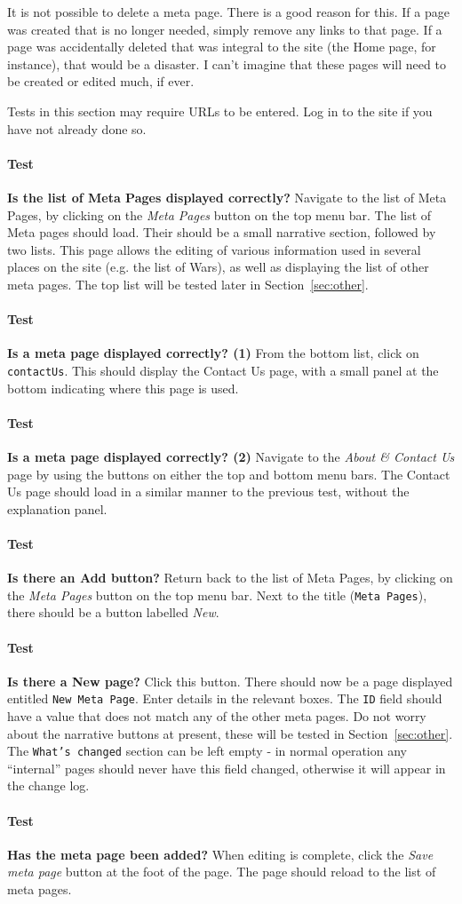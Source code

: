 \documentclass[12pt]{article}
\newcounter{Test}
\newcommand{\test}[1]{%
\stepcounter{Test}%
\paragraph{Test \theTest} \textbf{#1} }
\begin{document}
It is not possible to delete a meta page. There is a good reason for this. If a page was created that is no longer needed, simply remove any links to that page. If a page was accidentally deleted that was integral to the site (the Home page, for instance), that would be a disaster. I can't imagine that these pages will need to be created or edited much, if ever.

Tests in this section may require URLs to be entered. Log in to the site if you have not already done so.

\test{Is the list of Meta Pages displayed correctly?}
Navigate to the list of Meta Pages, by clicking on the \textit{Meta Pages} button on the top menu bar. The list of Meta pages should load. Their should be a small narrative section, followed by two lists. This page allows the editing of various information used in several places on the site (e.g. the list of Wars), as well as displaying the list of other meta pages. The top list will be tested later in Section~\ref{sec:other}.

\test{Is a meta page displayed correctly? (1)}
From the bottom list, click on \texttt{contactUs}. This should display the Contact Us page, with a small panel at the bottom indicating where this page is used.

\test{Is a meta page displayed correctly? (2)}
Navigate to the \textit{About \& Contact Us} page by using the buttons on either the top and bottom menu bars. The Contact Us page should load in a similar manner to the previous test, without the explanation panel.

\test{Is there an Add button?}
Return back to the list of Meta Pages, by clicking on the \textit{Meta Pages} button on the top menu bar. Next to the title (\texttt{Meta Pages}), there should be a button labelled \textit{New}.

\test{Is there a New page?}
Click this button. There should now be a page displayed entitled \texttt{New Meta Page}. Enter details in the relevant boxes. The \texttt{ID} field should have a value that does not match any of the other meta pages. Do not worry about the narrative buttons at present, these will be tested in Section~\ref{sec:other}. The \texttt{What's changed} section can be left empty - in normal operation any ``internal'' pages should never have this field changed, otherwise it will appear in the change log.

\test{Has the meta page been added?}
When editing is complete, click the \textit{Save meta page} button at the foot of the page. The page should reload to the list of meta pages.
\end{document}
